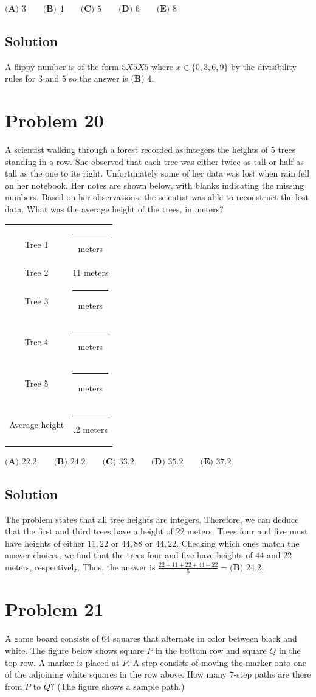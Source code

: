 \documentclass{article}
\begin{document}
$\textbf{(A) }3 \qquad \textbf{(B) }4 \qquad \textbf{(C) }5 \qquad \textbf{(D) }6 \qquad \textbf{(E) }8$
\subsection{Solution}
A flippy number is of the form $5X5X5$ where $x\in\{0,3,6,9\}$ by the divisibility rules for $3$ and $5$ so the answer is $\textbf{(B) }4$.
\section{Problem 20}
A scientist walking through a forest recorded as integers the heights of $5$ trees standing in a row. She observed that each tree was either twice as tall or half as tall as the one to its right. Unfortunately some of her data was lost when rain fell on her notebook. Her notes are shown below, with blanks indicating the missing numbers. Based on her observations, the scientist was able to reconstruct the lost data. What was the average height of the trees, in meters?


    
\begin{tabular}{|c|c|}
\hline Tree 1 & \rule{0.2cm}{0.15mm} meters \\
Tree 2 & 11 meters \\
Tree 3 & \rule{0.2cm}{0.15mm} meters \\
Tree 4 & \rule{0.2cm}{0.15mm} meters \\
Tree 5 & \rule{0.2cm}{0.15mm} meters \\ \hline
Average height & \rule{0.2cm}{0.15mm}.2 meters \\
\hline
\end{tabular}


$\textbf{(A) }22.2 \qquad \textbf{(B) }24.2 \qquad \textbf{(C) }33.2 \qquad \textbf{(D) }35.2 \qquad \textbf{(E) }37.2$
\subsection{Solution}
The problem states that all tree heights are integers. Therefore, we can deduce that the first and third trees have a height of $22$ meters. Trees four and five must have heights of either $11,22$ or $44,88$ or $44,22$. Checking which ones match the answer choices, we find that the trees four and five have heights of $44$ and $22$ meters, respectively. Thus, the answer is $\frac{22+11+22+44+22}5=\textbf{(B) }24.2$.

\section{Problem 21}
A game board consists of $64$ squares that alternate in color between black and white. The figure below shows square $P$ in the bottom row and square $Q$ in the top row. A marker is placed at $P.$ A step consists of moving the marker onto one of the adjoining white squares in the row above. How many $7$-step paths are there from $P$ to $Q?$ (The figure shows a sample path.)
\end{document}
